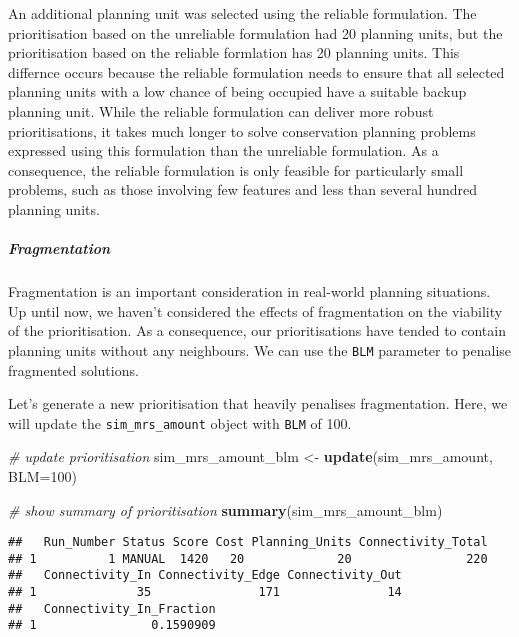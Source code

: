 \documentclass[11pt,]{article}
\newenvironment{Shaded}{\begin{snugshade}}{\end{snugshade}}
\newcommand{\KeywordTok}[1]{\textcolor[rgb]{0.13,0.29,0.53}{\textbf{{#1}}}}
\newcommand{\DataTypeTok}[1]{\textcolor[rgb]{0.13,0.29,0.53}{{#1}}}
\newcommand{\DecValTok}[1]{\textcolor[rgb]{0.00,0.00,0.81}{{#1}}}
\newcommand{\StringTok}[1]{\textcolor[rgb]{0.31,0.60,0.02}{{#1}}}
\newcommand{\CommentTok}[1]{\textcolor[rgb]{0.56,0.35,0.01}{\textit{{#1}}}}
\newcommand{\NormalTok}[1]{{#1}}
\begin{document}
An additional planning unit was selected using the reliable formulation.
The prioritisation based on the unreliable formulation had 20 planning
units, but the prioritisation based on the reliable formlation has 20
planning units. This differnce occurs because the reliable formulation
needs to ensure that all selected planning units with a low chance of
being occupied have a suitable backup planning unit. While the reliable
formulation can deliver more robust prioritisations, it takes much
longer to solve conservation planning problems expressed using this
formulation than the unreliable formulation. As a consequence, the
reliable formulation is only feasible for particularly small problems,
such as those involving few features and less than several hundred
planning units.

\subparagraph{Fragmentation}\label{fragmentation}

Fragmentation is an important consideration in real-world planning
situations. Up until now, we haven't considered the effects of
fragmentation on the viability of the prioritisation. As a consequence,
our prioritisations have tended to contain planning units without any
neighbours. We can use the \texttt{BLM} parameter to penalise fragmented
solutions.

Let's generate a new prioritisation that heavily penalises
fragmentation. Here, we will update the \texttt{sim\_mrs\_amount} object
with \texttt{BLM} of 100.

\begin{Shaded}
\begin{Highlighting}[]
\CommentTok{# update prioritisation}
\NormalTok{sim_mrs_amount_blm <-}\StringTok{ }\KeywordTok{update}\NormalTok{(sim_mrs_amount, }\DataTypeTok{BLM=}\DecValTok{100}\NormalTok{)}
\end{Highlighting}
\end{Shaded}

\begin{Shaded}
\begin{Highlighting}[]
\CommentTok{# show summary of prioritisation}
\KeywordTok{summary}\NormalTok{(sim_mrs_amount_blm)}
\end{Highlighting}
\end{Shaded}

\begin{verbatim}
##   Run_Number Status Score Cost Planning_Units Connectivity_Total
## 1          1 MANUAL  1420   20             20                220
##   Connectivity_In Connectivity_Edge Connectivity_Out
## 1              35               171               14
##   Connectivity_In_Fraction
## 1                0.1590909
\end{verbatim}
\end{document}
